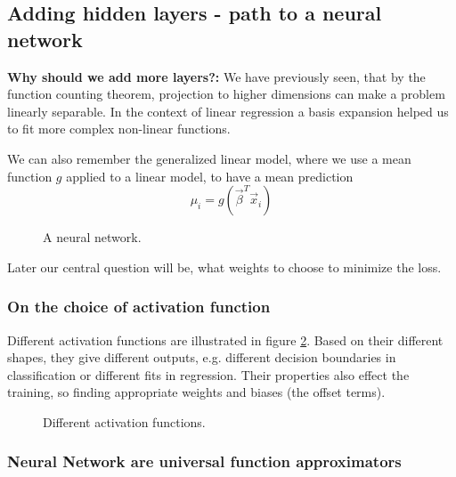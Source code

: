 \subsection{Adding hidden layers - path to a neural network}
\textbf{Why should we add more layers?:} We have previously seen, 
that by the function counting theorem,
projection to higher dimensions can make a problem linearly separable.
In the context of linear regression a basis expansion helped us to fit
more complex non-linear functions.

We can also remember the generalized linear model, where we use a 
mean function $g$ applied to a linear model, to have a mean prediction
\begin{equation}
    \mu_i = g(\vec{\beta}^T \vec{x}_i)
\end{equation}


\begin{figure}[!htb]
    \centering
    
    \caption{A neural network.}
    \label{fig:nn_illu}
\end{figure}

Later our central question will be, what weights to choose to minimize the loss.

\subsubsection{On the choice of activation function}
Different activation functions are illustrated in figure \ref{fig:activation_functions}.
Based on their different shapes, they give different outputs, e.g. different
decision boundaries in classification or different fits in regression. Their properties
also effect the training, so finding appropriate weights and biases (the offset terms).

\begin{figure}[!htb]
    \centering
    
    \caption{Different activation functions.}
    \label{fig:activation_functions}
\end{figure}

\subsubsection{Neural Network are universal function approximators}


